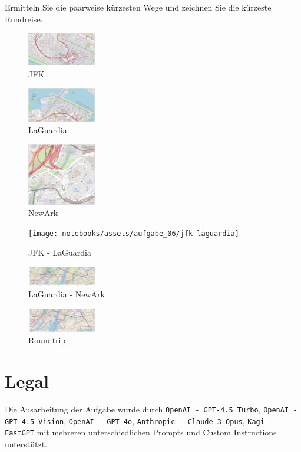 \documentclass[a4paper,11pt]{report}
\begin{document}
Ermitteln Sie die paarweise kürzesten Wege und zeichnen Sie die kürzeste Rundreise.

\begin{figure}[htbp]
    \centering
    \includegraphics[width=3cm]{notebooks/assets/aufgabe_06/jfk}
    \caption{JFK}
    \label{fig:jfk}
\end{figure}

\begin{figure}[htbp]
    \centering
    \includegraphics[width=3cm]{notebooks/assets/aufgabe_06/laguardia}
    \caption{LaGuardia}
    \label{fig:laguardia}
\end{figure}

\begin{figure}[htbp]
    \centering
    \includegraphics[width=3cm]{notebooks/assets/aufgabe_06/newark}
    \caption{NewArk}
    \label{fig:newark}
\end{figure}

\begin{figure}[htbp]
    \centering
    \texttt{[image: notebooks/assets/aufgabe\_06/jfk-laguardia]}
    \caption{JFK - LaGuardia}
    \label{fig:jfk-laguardia}
\end{figure}

\begin{figure}[htbp]
    \centering
    \includegraphics[width=3cm]{notebooks/assets/aufgabe_06/laguardia-newark}
    \caption{LaGuardia - NewArk}
    \label{fig:laguardia-newark}
\end{figure}

\begin{figure}[htbp]
    \centering
    \includegraphics[width=3cm]{notebooks/assets/aufgabe_06/roundtrip}
    \caption{Roundtrip}
    \label{fig:roundtrip}
\end{figure}
\newpage

\chapter{Legal}
Die Ausarbeitung der Aufgabe wurde durch \texttt{OpenAI - GPT-4.5 Turbo}, \texttt{OpenAI - GPT-4.5 Vision}, \texttt{OpenAI - GPT-4o}, \texttt{Anthropic -- Claude 3 Opus},  \texttt{Kagi - FastGPT} mit mehreren unterschiedlichen Prompts und Custom Instructions unterstützt.
\end{document}
